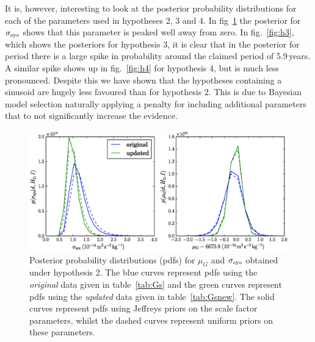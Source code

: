 \documentclass[page-classic]{epl2}
\begin{document}
It is, however, interesting to look at the posterior probability distributions for each of the parameters used
in hypotheses 2, 3 and 4. In fig~\ref{fig:h2} the posterior for $\sigma_{\rm sys}$ shows that this parameter
is peaked well away from zero.
In fig.~\ref{fig:h3}, which shows the posteriors for hypothesis 3, it is clear that in the
posterior for period there is a large spike in probability around the claimed period of 5.9\,years.
A similar spike shows up in fig.~\ref{fig:h4} for hypothesis 4, but is much less pronounced. Despite this we
have shown that the hypotheses containing a sinusoid are hugely less favoured than for hypothesis 2.
This is due to Bayesian model selection naturally applying a penalty for including additional parameters that
to not significantly increase the evidence.

\begin{figure}
 \centerline{\includegraphics[width=1.0\textwidth]{hypothesis2}}
 \caption{Posterior probability distributions (pdfs) for $\mu_G$ and $\sigma_{\rm sys}$ obtained under hypothesis 2.
 The blue curves represent pdfs using the {\it original} data given in table~\ref{tab:Gs} and the green curves
 represent pdfs using the {\it updated} data given in table~\ref{tab:Gsnew}. The solid curves represent pdfs
 using Jeffreys priors on the scale factor parameters, whilst the dashed curves represent uniform priors on
 these parameters.}
 \label{fig:h2}
\end{figure}
\end{document}
